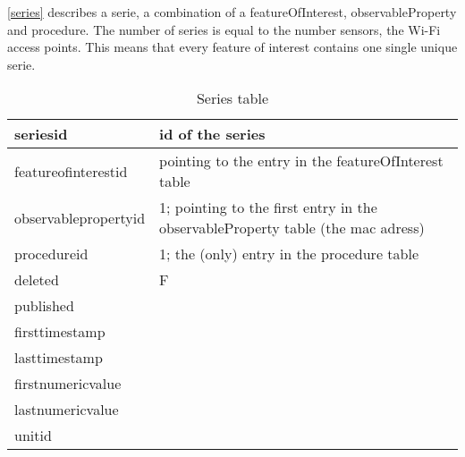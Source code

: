 \autoref{series} describes a serie, a combination of a featureOfInterest, observableProperty and procedure. The number of series is equal to the number sensors, the Wi-Fi access points. This means that every  feature of interest contains one single unique serie.

\begin{table}[]
\centering
\caption{Series table}
\label{series}
\begin{tabular}{@{}ll@{}}
\toprule
\textbf{seriesid}    & \textbf{id of the series}                                                       \\ \midrule
featureofinterestid  & pointing to the entry in the featureOfInterest table                            \\ \midrule
observablepropertyid & 1; pointing to the first entry in the observableProperty table (the mac adress) \\ \midrule
procedureid          & 1; the (only) entry in the procedure table                                      \\ \midrule
deleted              & F                                                                               \\ \midrule
published            &                                                                                 \\ \midrule
firsttimestamp       &                                                                                 \\ \midrule
lasttimestamp        &                                                                                 \\ \midrule
firstnumericvalue    &                                                                                 \\ \midrule
lastnumericvalue     &                                                                                 \\
unitid               &                                                                                 \\ \bottomrule
\end{tabular}
\end{table}

